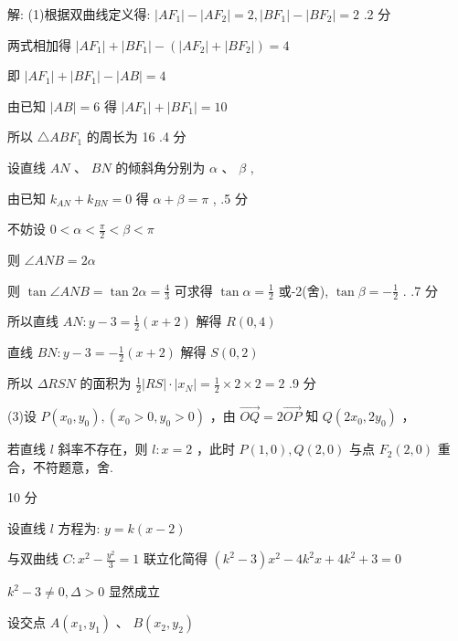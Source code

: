 \documentclass[10pt]{article}
\begin{document}
解: (1)根据双曲线定义得: \(\left| {A{F}_{1}}\right|  - \left| {A{F}_{2}}\right|  = 2,\left| {B{F}_{1}}\right|  - \left| {B{F}_{2}}\right|  = 2\) .2 分

两式相加得 \(\left| {A{F}_{1}}\right|  + \left| {B{F}_{1}}\right|  - \left( {\left| {A{F}_{2}}\right|  + \left| {B{F}_{2}}\right| }\right)  = 4\)

即 \(\left| {A{F}_{1}}\right|  + \left| {B{F}_{1}}\right|  - \left| {AB}\right|  = 4\)

由已知 \(\left| {AB}\right|  = 6\) 得 \(\left| {A{F}_{1}}\right|  + \left| {B{F}_{1}}\right|  = {10}\)

所以 \(\bigtriangleup {AB}{F}_{1}\) 的周长为 16 .4 分

设直线 \({AN}\text{ 、 }{BN}\) 的倾斜角分别为 \(\alpha \text{ 、 }\beta\) ,

由已知 \({k}_{AN} + {k}_{BN} = 0\) 得 \(\alpha  + \beta  = \pi\) , .5 分

不妨设 \(0 < \alpha  < \frac{\pi }{2} < \beta  < \pi\)

则 \(\angle {ANB} = {2\alpha }\)

则 \(\tan \angle {ANB} = \tan {2\alpha } = \frac{4}{3}\) 可求得 \(\tan \alpha  = \frac{1}{2}\) 或-2(舍), \(\tan \beta  =  - \frac{1}{2}\) . .7 分

所以直线 \({AN} : y - 3 = \frac{1}{2}\left( {x + 2}\right)\) 解得 \(R\left( {0,4}\right)\)

直线 \({BN} : y - 3 =  - \frac{1}{2}\left( {x + 2}\right)\) 解得 \(S\left( {0,2}\right)\)

所以 \({\Delta RSN}\) 的面积为 \(\frac{1}{2}\left| {RS}\right|  \cdot  \left| {x}_{N}\right|  = \frac{1}{2} \times  2 \times  2 = 2\) .9 分

(3)设 \(P\left( {{x}_{0},{y}_{0}}\right) ,\left( {{x}_{0} > 0,{y}_{0} > 0}\right)\) ，由 \(\overrightarrow{OQ} = 2\overrightarrow{OP}\) 知 \(Q\left( {2{x}_{0},2{y}_{0}}\right)\) ，

若直线 \(l\) 斜率不存在，则 \(l : x = 2\) ，此时 \(P\left( {1,0}\right) ,Q\left( {2,0}\right)\) 与点 \({F}_{2}\left( {2,0}\right)\) 重合，不符题意，舍.

10 分

设直线 \(l\) 方程为: \(y = k\left( {x - 2}\right)\)

与双曲线 \(C : {x}^{2} - \frac{{y}^{2}}{3} = 1\) 联立化简得 \(\left( {{k}^{2} - 3}\right) {x}^{2} - 4{k}^{2}x + 4{k}^{2} + 3 = 0\)

\({k}^{2} - 3 \neq  0,\Delta  > 0\) 显然成立

设交点 \(A\left( {{x}_{1},{y}_{1}}\right) \text{ 、 }B\left( {{x}_{2},{y}_{2}}\right)\)
\end{document}
